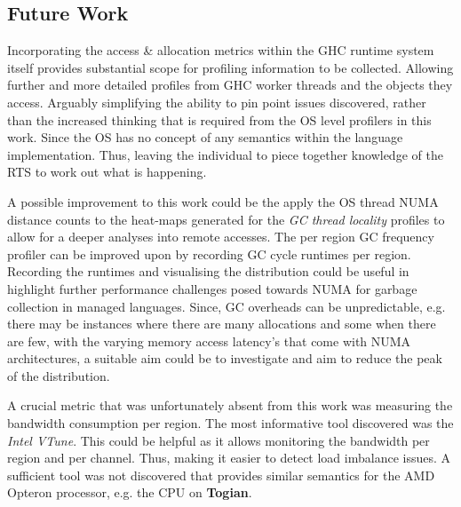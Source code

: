 \documentclass{paper}\usepackage{graphicx}
\begin{document}
\subsection{Future Work}

Incorporating the access \& allocation metrics within the GHC runtime system itself provides substantial scope for profiling information to be collected. Allowing further and more detailed profiles from GHC worker threads and the objects they access. Arguably simplifying the ability to pin point issues discovered, rather than the increased thinking that is required from the OS level profilers in this work. Since the OS has no concept of any semantics within the language implementation. Thus, leaving the individual to piece together knowledge of the RTS to work out what is happening.

A possible improvement to this work could be the apply the OS thread NUMA distance counts to the heat-maps generated for the \textit{GC thread locality} profiles to allow for a deeper analyses into remote accesses. The per region GC frequency profiler can be improved upon by recording GC cycle runtimes per region. Recording the runtimes and visualising the distribution could be useful in highlight further performance challenges posed towards NUMA for garbage collection in managed languages. Since, GC overheads can be unpredictable, e.g. there may be instances where there are many allocations and some when there are few, with the varying memory access latency's that come with NUMA architectures, a suitable aim could be to investigate and aim to reduce the peak of the distribution.

A crucial metric that was unfortunately absent from this work was measuring the bandwidth consumption per region. The most informative tool discovered was the \textit{Intel VTune}. This could be helpful as it allows monitoring the bandwidth per region and per channel. Thus, making it easier to detect load imbalance issues. A sufficient tool was not discovered that provides similar semantics for the AMD Opteron processor, e.g. the CPU on \textbf{Togian}.
\end{document}
